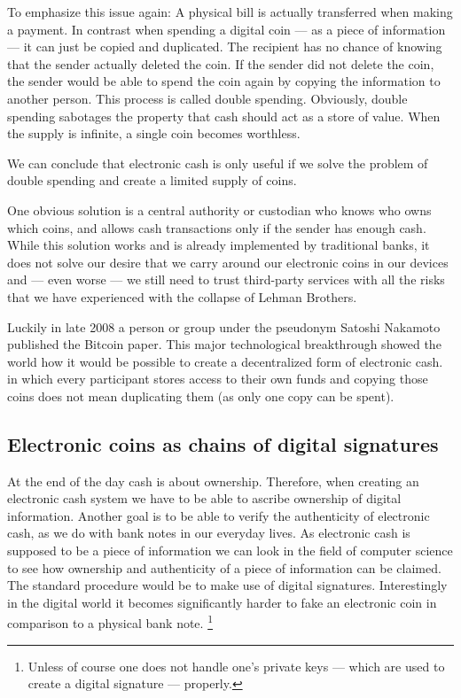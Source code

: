 \documentclass[a4paper,12pt,oneside,openany]{book}
\begin{document}
To emphasize this issue again: A physical bill is actually transferred when making a payment. In contrast when spending a digital coin --- as a piece of information --- it can just be copied and duplicated.
The recipient has no chance of knowing that the sender actually deleted the coin.
If the sender did not delete the coin, the sender would be able to spend the coin again by copying the information to another person.
This process is called double spending.
Obviously, double spending sabotages the property that cash should act as a store of value. When the supply is infinite, a single coin becomes worthless. 

We can conclude that electronic cash is only useful if we solve the problem of double spending and create a limited supply of coins.

One obvious solution is a central authority or custodian who knows who owns which coins, and allows cash transactions only if the sender has enough cash.
While this solution works and is already implemented by traditional banks, it does not solve our desire that we carry around our electronic coins in our devices and --- even worse --- we still need to trust third-party services with all the risks that we have experienced with the collapse of Lehman Brothers.

Luckily in late 2008 a person or group under the pseudonym Satoshi Nakamoto published the Bitcoin paper.
This major technological breakthrough showed the world how it would be possible to create a decentralized form of electronic cash.
in which every participant stores access to their own funds and copying those coins does not mean duplicating them (as only one copy can be spent).

\subsection{Electronic coins as chains of digital signatures}
At the end of the day cash is about ownership.
Therefore, when creating an electronic cash system we have to be able to ascribe ownership of digital information. 
Another goal is to be able to verify the authenticity of electronic cash, as we do with bank notes in our everyday lives.
As electronic cash is supposed to be a piece of information we can look in the field of computer science to see how ownership and authenticity of a piece of information can be claimed.
The standard procedure would be to make use of \gls{digital signature}s.
Interestingly in the digital world it becomes significantly harder to fake an electronic coin in comparison to a physical bank note.
\footnote{Unless of course one does not handle one's private keys --- which are used to create a digital signature --- properly.}
\end{document}
